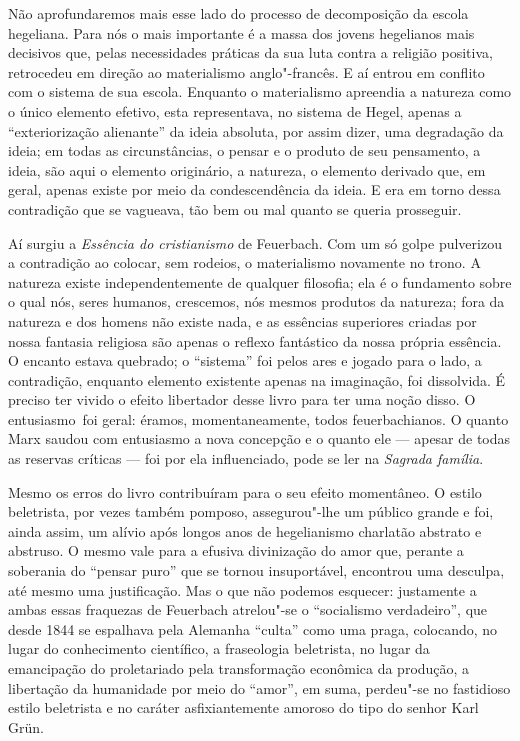 Não aprofundaremos mais esse lado do processo de decomposição da escola
hegeliana. Para nós o mais importante é a massa dos jovens hegelianos
mais decisivos que, pelas necessidades práticas da sua luta contra a
religião positiva, retrocedeu em direção ao materialismo anglo"-francês.
E aí entrou em conflito com o sistema de sua escola. Enquanto o
materialismo apreendia a natureza como o único elemento efetivo, esta
representava, no sistema
de Hegel, apenas a ``exteriorização alienante'' da ideia 
absoluta, por assim dizer, uma degradação da ideia; em todas as
circunstâncias, o pensar e o produto de seu pensamento, a ideia, são %
aqui o elemento originário, a natureza, o elemento derivado que, em
geral, apenas existe por meio da condescendência da ideia. E era em torno
dessa contradição que se vagueava, tão bem ou mal quanto se queria
prosseguir.

Aí surgiu a \emph{Essência do cristianismo} de Feuerbach.
Com um só golpe pulverizou a contradição ao colocar, sem rodeios,
o materialismo novamente no trono. A natureza existe independentemente
de qualquer filosofia; ela é o fundamento sobre o qual nós, seres
humanos, crescemos, nós mesmos produtos da natureza; fora da natureza e
dos homens não existe nada, e as essências superiores criadas por nossa
fantasia religiosa são apenas o reflexo fantástico da nossa própria
essência. O encanto estava quebrado; o ``sistema'' foi pelos ares e
jogado para o lado, a contradição, enquanto elemento existente apenas na
imaginação, foi dissolvida. É preciso ter vivido o
efeito libertador desse livro para ter uma noção disso. O entusiasmo\est\ foi
geral: éramos, momentaneamente, todos feuerbachianos. O quanto Marx
saudou com entusiasmo a nova concepção \textbar{} e o quanto ele --- apesar de
todas as reservas críticas --- foi por ela influenciado, \textbar{} pode se ler
na \emph{Sagrada família}.

Mesmo os erros do livro contribuíram para o seu efeito momentâneo. O
estilo beletrista, por vezes também pomposo, assegurou"-lhe um público
grande e foi, ainda assim, um alívio após longos anos de hegelianismo
charlatão abstrato e abstruso. O mesmo vale para a efusiva divinização
do amor que, perante a soberania do ``pensar puro'' que se tornou
insuportável, encontrou uma desculpa, até mesmo uma justificação. Mas o
que não podemos esquecer: justamente a ambas essas fraquezas
de Feuerbach
atrelou"-se o ``socialismo verdadeiro'', que desde 1844 se espalhava pela
Alemanha ``culta'' como uma praga, colocando, no lugar do conhecimento
científico, a fraseologia beletrista, no lugar da emancipação do
proletariado pela transformação econômica da 
produção, a libertação da humanidade por meio do ``amor'', em suma,
perdeu"-se no fastidioso estilo beletrista e no caráter asfixiantemente
amoroso do tipo do senhor Karl Grün.

